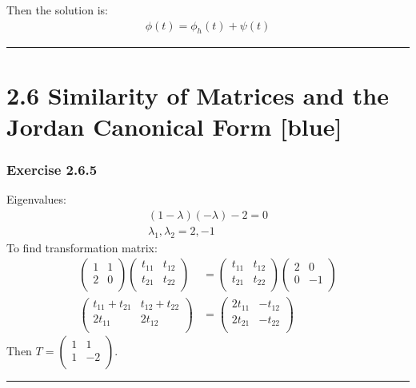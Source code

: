 \documentclass[12pt, letterpaper]{scrartcl}
\begin{document}
Then the solution is:
\begin{align*}
    \phi(t)=\phi_h(t)+\psi(t)
\end{align*}

\vskip1mm\hrule

\clearpage

\section*{2.6 Similarity of Matrices and the Jordan Canonical Form \xrfill[2pt]{3pt}[blue]}

\subsubsection*{Exercise 2.6.5}
Eigenvalues:
\begin{align*}
    (1-\lambda)(-\lambda)-2=0\\
    \lambda_1,\lambda_2=2, -1
\end{align*}
To find transformation matrix:
\begin{align*}
    \left(\begin{array}{cc}
        1 & 1 \\
        2 & 0 \\
    \end{array}\right)
    \left(\begin{array}{cc}
        t_{11} & t_{12} \\
        t_{21} & t_{22} \\
    \end{array}\right)
    &=
    \left(\begin{array}{cc}
        t_{11} & t_{12} \\
        t_{21} & t_{22} \\
    \end{array}\right)
    \left(\begin{array}{cc}
        2 & 0 \\
        0 & -1 \\
    \end{array}\right)\\
    \left(\begin{array}{cc}
        t_{11}+t_{21} & t_{12}+t_{22} \\
        2t_{11} & 2t_{12} \\
    \end{array}\right)
    &=
    \left(\begin{array}{cc}
        2t_{11} & -t_{12} \\
        2t_{21} & -t_{22} \\
    \end{array}\right)
\end{align*}
Then $T=\left(\begin{array}{cc} 1 & 1 \\ 1 & -2 \\ \end{array}\right)$.
\vskip1mm\hrule
\end{document}
